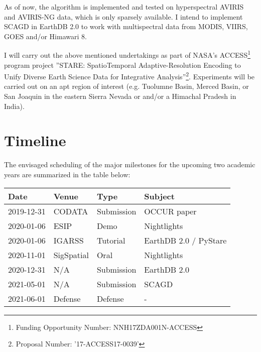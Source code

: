 \documentclass[letterpaper, parskip=half]{scrartcl}
\begin{document}
 
As of now, the algorithm is implemented and tested on hyperspectral \gls{AVIRIS} and \gls{AVIRIS-NG} data, which is only sparsely available. I intend to implement \gls{SCAGD} in EarthDB 2.0 to work with multispectral data from \gls{MODIS}, \gls{VIIRS}, \gls{GOES} and/or Himawari 8.

I will carry out the above mentioned undertakings as part of NASA's \gls{ACCESS}\footnote{Funding Opportunity Number: NNH17ZDA001N-ACCESS} program project ''STARE: SpatioTemporal Adaptive-Resolution Encoding to Unify Diverse Earth Science Data for Integrative Analysis''\footnote{Proposal Number: '17-ACCESS17-0039'}. Experiments will be carried out on an apt region of interest (e.g. Tuolumne Basin, Merced Basin, or San Joaquin in the eastern Sierra Nevada or and/or a Himachal Pradesh in India). 


\newpage
\section{Timeline}


\begin{table}[ht]
 \centering
 
The envisaged scheduling of the major milestones for the upcoming two academic years are summarized in the table below:

\begin{tabular}{l l l l}
\toprule
    Date        & Venue            & Type       & Subject                           \\ \midrule
    2019-12-31  & CODATA           & Submission & OCCUR paper                       \\
    2020-01-06  & ESIP             & Demo       & Nightlights 	                    \\
    2020-01-06  & IGARSS           & Tutorial   & EarthDB 2.0 / PyStare             \\
    2020-11-01  & SigSpatial	   & Oral       & Nightlights 	                    \\
    2020-12-31  & N/A              & Submission & EarthDB 2.0                       \\
    2021-05-01  & N/A              & Submission & SCAGD                             \\
    2021-06-01  & Defense	       & Defense    &  -                                \\
\bottomrule
    
    
\end{tabular}
\end{table}
\end{document}
